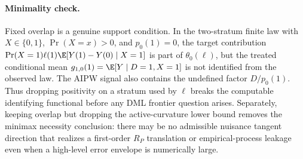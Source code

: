 \paragraph{Minimality check.}
Fixed overlap is a genuine support condition.  In the two-stratum finite law
with \(X\in\{0,1\}\), \(\Pr(X=x)>0\), and \(p_0(1)=0\), the target contribution
\(\Pr(X=1)\ell(1)\E[Y(1)-Y(0)\mid X=1]\) is part of
\(\theta_0(\ell)\), but the treated conditional mean \(g_{1,0}(1)=\E[Y\mid
D=1,X=1]\) is not identified from the observed law.  The AIPW signal also
contains the undefined factor \(D/p_0(1)\).  Thus dropping positivity on a
stratum used by \(\ell\) breaks the computable identifying functional before
any DML frontier question arises.  Separately, keeping overlap but dropping
the active-curvature lower bound removes the minimax necessity conclusion:
there may be no admissible nuisance tangent direction that realizes a
first-order \(R_P\) translation or empirical-process leakage even when a
high-level error envelope is numerically large.
